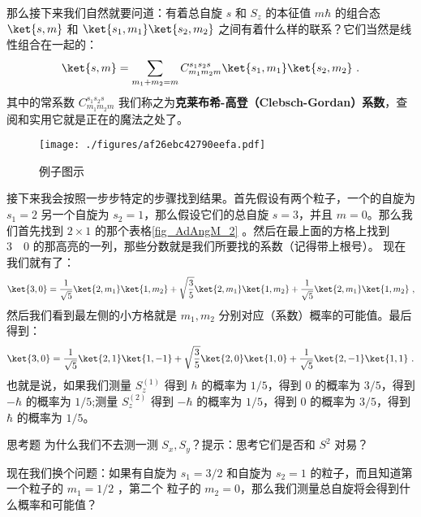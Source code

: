 那么接下来我们自然就要问道：有着总自旋 $s$ 和 $S_z$ 的本征值 $m\hbar$ 的组合态 $\ket{s,m}$ 和 $\ket{s_1,m_1}\ket{s_2,m_2}$ 之间有着什么样的联系？它们当然是线性组合在一起的：
\begin{equation}
\ket{s,m}=\sum_{m_1+m_2=m}C^{s_1s_2s}_{m_1m_2m}\ket{s_1,m_1}\ket{s_2,m_2}~.
\end{equation}
其中的常系数 $C^{s_1s_2s}_{m_1m_2m}$ 我们称之为\textbf{克莱布希-高登（Clebsch-Gordan）系数}，查阅和实用它就是正在的魔法之处了。
\begin{figure}[ht]
\centering
\texttt{[image: ./figures/af26ebc42790eefa.pdf]}
\caption{例子图示} \label{fig_AdAngM_2}
\end{figure}
接下来我会按照一步步特定的步骤找到结果。首先假设有两个粒子，一个的自旋为 $s_1 = 2$ 另一个自旋为 $s_2 = 1$，那么假设它们的总自旋 $s=3$，并且 $m=0$。那么我们首先找到 $2\times 1$ 的那个表格\autoref{fig_AdAngM_2}  。然后在最上面的方格上找到 $3\quad 0$ 的那高亮的一列，那些分数就是我们所要找的系数（记得带上根号）。
现在我们就有了：
\begin{equation}
\ket{3,0}=\frac{1}{\sqrt{5}}\ket{2,m_1}\ket{1,m_2}+\sqrt{\frac{3}{5}}\ket{2,m_1}\ket{1,m_2}+\frac{1}{\sqrt{5}}\ket{2,m_1}\ket{1,m_2}~,
\end{equation}
然后我们看到最左侧的小方格就是 $m_1,m_2$ 分别对应（系数）概率的可能值。最后得到：
\begin{equation}
\ket{3,0}=\frac{1}{\sqrt{5}}\ket{2,1}\ket{1,-1}+\sqrt{\frac{3}{5}}\ket{2,0}\ket{1,0}+\frac{1}{\sqrt{5}}\ket{2,-1}\ket{1,1}~.
\end{equation}
也就是说，如果我们测量 $S_z^{(1)}$ 得到 $\hbar$ 的概率为 $1/5$，得到 $0$ 的概率为 $3/5$，得到 $-\hbar$ 的概率为 $1/5$;测量 $S_z^{(2)}$ 得到 $-\hbar$ 的概率为 $1/5$，得到 $0$ 的概率为 $3/5$，得到 $\hbar$ 的概率为 $1/5$。

\begin{exercise}{思考题}
为什么我们不去测一测 $S_x,S_y$？提示：思考它们是否和 $S^2$ 对易？
\end{exercise}

现在我们换个问题：如果有自旋为 $s_1=3/2$ 和自旋为 $s_2= 1 $ 的粒子，而且知道第一个粒子的 $ m_1 =1/2$ ，第二个
粒子的 $ m_2 =0$，那么我们测量总自旋将会得到什么概率和可能值？

